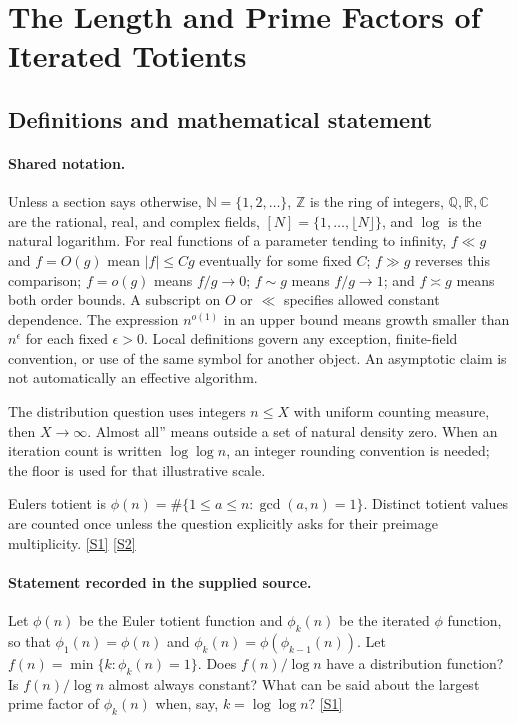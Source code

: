 \documentclass[11pt,a4paper]{article}
\newcommand{\N}{\mathbb{N}}
\newcommand{\Z}{\mathbb{Z}}
\newcommand{\Q}{\mathbb{Q}}
\newcommand{\R}{\mathbb{R}}
\newcommand{\C}{\mathbb{C}}
\newcommand{\sref}[2]{\hyperlink{source:#1:#2}{[S#2]}}
\begin{document}
\section{The Length and Prime Factors of Iterated Totients}\label{statement}


\subsection{Definitions and mathematical statement}

\paragraph{Shared notation.}Unless a section says otherwise, $\N=\{1,2,\ldots\}$,
$\Z$ is the ring of integers, $\Q,\R,\C$ are the rational, real, and complex
fields, $[N]=\{1,\ldots,\lfloor N\rfloor\}$, and $\log$ is the natural
logarithm. For real functions of a parameter tending to infinity,
$f\ll g$ and $f=O(g)$ mean $|f|\leq Cg$ eventually for some fixed $C$;
$f\gg g$ reverses this comparison; $f=o(g)$ means $f/g\to0$;
$f\sim g$ means $f/g\to1$; and $f\asymp g$ means both order bounds.
A subscript on $O$ or $\ll$ specifies allowed constant dependence.
The expression $n^{o(1)}$ in an upper bound means growth smaller than
$n^\epsilon$ for each fixed $\epsilon>0$. Local definitions govern any
exception, finite-field convention, or use of the same symbol for another
object. An asymptotic claim is not automatically an effective algorithm.



The distribution question uses integers $n\leq X$ with uniform counting measure, then $X\to\infty$. Almost all'' means outside a set of natural density zero. When an iteration count is written $\log\log n$, an integer rounding convention is needed; the floor is used for that illustrative scale.

Euler\textquotesingle s totient is $\phi(n)=\#\{1\leq a\leq n:\gcd(a,n)=1\}$. Distinct totient values are counted once unless the question explicitly asks for their preimage multiplicity. \sref{statement}{1} \sref{statement}{2}

\paragraph{Statement recorded in the supplied source.}
Let $\phi(n)$ be the Euler totient function and $\phi_k(n)$ be the iterated $\phi$ function, so that $\phi_1(n)=\phi(n)$ and $\phi_k(n)=\phi(\phi_{k-1}(n))$. Let $ f(n) = \min \{ k : \phi_k(n)=1\}. $ Does $f(n)/\log n$ have a distribution function? Is $f(n)/\log n$ almost always constant? What can be said about the largest prime factor of $\phi_k(n)$ when, say, $k=\log\log n$? \sref{statement}{1}
\end{document}
